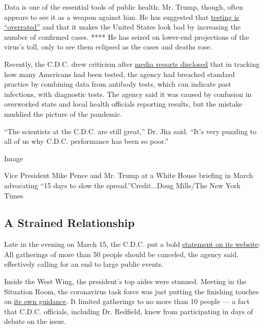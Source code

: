 Data is one of the essential tools of public health; Mr. Trump, though,
often appears to see it as a weapon against him. He has suggested that
\href{https://www.politico.com/news/2020/05/14/trump-coronavirus-testing-high-case-numbers-259524}{testing
is ``overrated''} and that it makes the United States look bad by
increasing the number of confirmed cases. **** He has seized on
lower-end projections of the virus's toll, only to see them eclipsed as
the cases and deaths rose.

Recently, the C.D.C. drew criticism after
\href{https://www.nytimes3xbfgragh.onion/2020/05/22/us/politics/coronavirus-tests-cdc.html}{media
reports disclosed} that in tracking how many Americans had been tested,
the agency had breached standard practice by combining data from
antibody tests, which can indicate past infections, with diagnostic
tests. The agency said it was caused by confusion in overworked state
and local health officials reporting results, but the mistake muddied
the picture of the pandemic.

``The scientists at the C.D.C. are still great,'' Dr. Jha said. ``It's
very puzzling to all of us why C.D.C. performance has been so poor.''

Image

Vice President Mike Pence and Mr. Trump at a White House briefing in
March advocating ``15 days to slow the spread.''Credit...Doug Mills/The
New York Times

\hypertarget{a-strained-relationship}{%
\subsection{A Strained Relationship}\label{a-strained-relationship}}

Late in the evening on March 15, the C.D.C. put a bold
\href{https://web.archive.org/web/20200316115537/https://www.cdc.gov/coronavirus/2019-ncov/community/large-events/mass-gatherings-ready-for-covid-19.html}{statement
on its website}: All gatherings of more than 50 people should be
canceled, the agency said, effectively calling for an end to large
public events.

Inside the West Wing, the president's top aides were stunned. Meeting in
the Situation Room, the coronavirus task force was just putting the
finishing touches on
\href{https://www.whitehouse.gov/briefings-statements/remarks-president-trump-vice-president-pence-members-coronavirus-task-force-press-briefing-3/}{its
own guidance}. It limited gatherings to no more than 10 people --- a
fact that C.D.C. officials, including Dr. Redfield, knew from
participating in days of debate on the issue.

